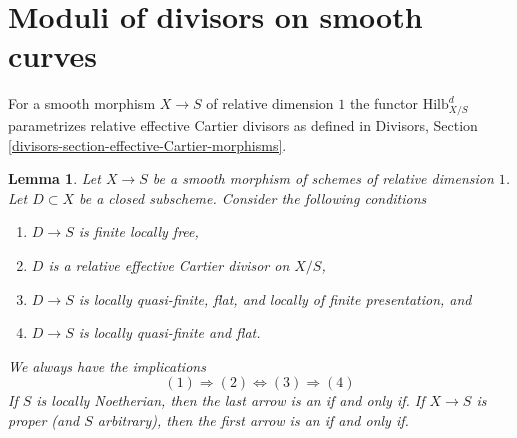 \documentclass{stacks-project}
\theoremstyle{plain}
\newtheorem{lemma}[subsection]{Lemma}
\theoremstyle{definition}
\theoremstyle{remark}
\numberwithin{equation}{subsection}
\def\Hilbfunctor{\mathrm{Hilb}}
\begin{document}
\section{Moduli of divisors on smooth curves}
\label{section-divisors}

\noindent
For a smooth morphism $X \to S$ of relative dimension $1$ the functor
$\Hilbfunctor^d_{X/S}$ parametrizes relative effective Cartier divisors
as defined in
Divisors, Section \ref{divisors-section-effective-Cartier-morphisms}.

\begin{lemma}
\label{lemma-divisors-on-curves}
Let $X \to S$ be a smooth morphism of schemes of relative dimension $1$.
Let $D \subset X$ be a closed subscheme. Consider the following conditions
\begin{enumerate}
\item $D \to S$ is finite locally free,
\item $D$ is a relative effective Cartier divisor on $X/S$,
\item $D \to S$ is locally quasi-finite, flat, and
locally of finite presentation, and
\item $D \to S$ is locally quasi-finite and flat.
\end{enumerate}
We always have the implications
$$
(1) \Rightarrow (2) \Leftrightarrow (3) \Rightarrow (4)
$$
If $S$ is locally Noetherian, then the last arrow is an if and only if.
If $X \to S$ is proper (and $S$ arbitrary), then the first arrow is
an if and only if.
\end{lemma}
\end{document}
